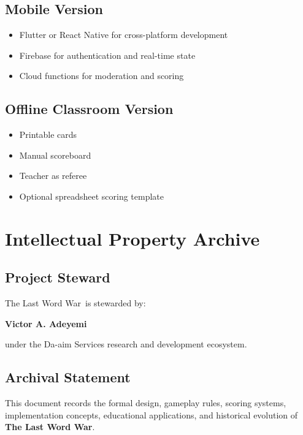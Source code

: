 \documentclass[11pt,a4paper]{article}
\begin{document}
\subsection{Mobile Version}

\begin{itemize}
    \item Flutter or React Native for cross-platform development
    \item Firebase for authentication and real-time state
    \item Cloud functions for moderation and scoring
\end{itemize}

\subsection{Offline Classroom Version}

\begin{itemize}
    \item Printable cards
    \item Manual scoreboard
    \item Teacher as referee
    \item Optional spreadsheet scoring template
\end{itemize}


\section{Intellectual Property Archive}

\subsection{Project Steward}

The Last Word War\texttrademark\ is stewarded by:

\begin{center}
\textbf{Victor A. Adeyemi}
\end{center}

under the Da-aim Services research and development ecosystem.

\subsection{Archival Statement}

This document records the formal design, gameplay rules,
scoring systems, implementation concepts, educational
applications, and historical evolution of
\textbf{The Last Word War\texttrademark}.
\end{document}
